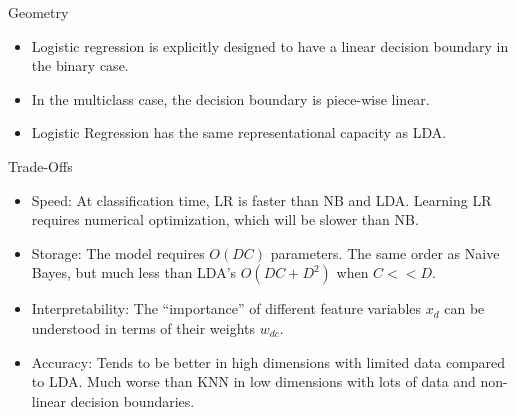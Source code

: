 \documentclass[serif,xcolor=pdftex,dvipsnames,table,hyperref={bookmarks=false}]{beamer}
\begin{document}
\begin{frame}[t]{Geometry}

\begin{itemize}
\setlength{\itemsep}{12pt}
\item Logistic regression is explicitly designed to have a linear decision boundary in the binary case.

\pause \item In the multiclass case, the decision boundary is piece-wise linear. 

\pause \item Logistic Regression has the same representational capacity as LDA.

\end{itemize}
\end{frame}


\begin{frame}[t]{Trade-Offs}

\begin{itemize}
\setlength{\itemsep}{6pt}
\item Speed: At classification time, LR is faster than NB and LDA. Learning LR requires numerical optimization, which will be slower than NB.  

\pause \item Storage: The model requires $O(DC)$ parameters. The same order as Naive Bayes, but much less than LDA's $O(DC + D^2)$ when $C<<D$.

\pause \item Interpretability: The ``importance'' of different feature variables $x_d$ can be understood in terms of their weights $w_{dc}$.

\pause \item Accuracy: Tends to be better in high dimensions with limited data compared to LDA. Much worse than KNN in low dimensions with lots of data and non-linear decision boundaries.
 
\end{itemize}
\end{frame}
\end{document}

